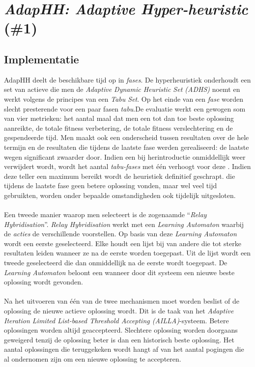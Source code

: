 \section{\emph{AdapHH: Adaptive Hyper-heuristic} (\#1)}
\subsection{Implementatie}
AdapHH\cite{chesc-adaphh,chesc-adaphh2,348072} deelt de beschikbare tijd op in \emph{fases}. De hyperheuristiek onderhoudt een set van actieve \abhn{} die men de \emph{Adaptive Dynamic Heuristic Set (ADHS)} noemt en werkt volgens de principes van een \emph{Tabu Set}\cite{DBLP:journals/informs/Glover89}. Op het einde van een \emph{fase} worden slecht presterende \abhn{} voor een paar fasen \emph{tabu}.De evaluatie werkt een gewogen som van vier metrieken: het aantal maal dat men een tot dan toe beste oplossing aanreikte, de totale fitness verbetering, de totale fitness verslechtering en de gespendeerde tijd. Men maakt ook een onderscheid tussen resultaten over de hele termijn en de resultaten die tijdens de laatste fase werden gerealiseerd: de laatste wegen significant zwaarder door. Indien een \abh{} bij herintroductie onmiddellijk weer verwijdert wordt, wordt het aantal \emph{tabu-fases} met \'e\'en verhoogt voor deze \abh{}. Indien deze teller een maximum bereikt wordt de heuristiek definitief geschrapt. \abhn[H] die tijdens de laatste fase geen betere oplossing vonden, maar wel veel tijd gebruikten, worden onder bepaalde omstandigheden ook tijdelijk uitgesloten.

\paragraph{}
Een tweede manier waarop men \abhn{} selecteert is de zogenaamde ``\emph{Relay Hybridisation}''. \emph{Relay Hybridisation} werkt met een \emph{Learning Automaton}\cite{RePEc:cla:levarc:481} waarbij de \emph{acties} de verschillende \abhn{} voorstellen. Op basis van deze \emph{Learning Automaton} wordt een eerste \abh{} geselecteerd. Elke \abh{} houdt een lijst bij van andere \abh{} die tot sterke resultaten leiden wanneer ze na de eerste \abh{} worden toegepast. Uit de lijst wordt een tweede \abh{} geselecteerd die dan onmiddellijk na de eerste \abh{} wordt toegepast. De \emph{Learning Automaton} beloont een \abh{} wanneer door dit systeem een nieuwe beste oplossing wordt gevonden.

\paragraph{}
Na het uitvoeren van \'e\'en van de twee mechanismen moet worden beslist of de oplossing de nieuwe actieve oplossing wordt. Dit is de taak van het \emph{Adaptive Iteration Limited List-based Threshold Accepting (AILLA)}-systeem. Betere oplossingen worden altijd geaccepteerd. Slechtere oplossing worden doorgaans geweigerd tenzij de oplossing beter is dan een historisch beste oplossing. Het aantal oplossingen die teruggekeken wordt hangt af van het aantal pogingen die al ondernomen zijn om een nieuwe oplossing te accepteren.

